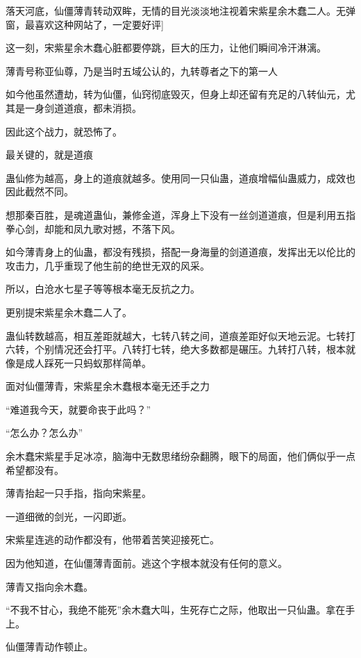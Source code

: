 
\begin{this_body}



落天河底，仙僵薄青转动双眸，无情的目光淡淡地注视着宋紫星余木蠢二人。无弹窗，最喜欢这种网站了，一定要好评]

这一刻，宋紫星余木蠢心脏都要停跳，巨大的压力，让他们瞬间冷汗淋漓。

薄青号称亚仙尊，乃是当时五域公认的，九转尊者之下的第一人

如今他虽然遭劫，转为仙僵，仙窍彻底毁灭，但身上却还留有充足的八转仙元，尤其是一身剑道道痕，都未消损。

因此这个战力，就恐怖了。

最关键的，就是道痕

蛊仙修为越高，身上的道痕就越多。使用同一只仙蛊，道痕增幅仙蛊威力，成效也因此截然不同。

想那秦百胜，是魂道蛊仙，兼修金道，浑身上下没有一丝剑道道痕，但是利用五指拳心剑，却能和凤九歌对撼，不落下风。

如今薄青身上的仙蛊，都没有残损，搭配一身海量的剑道道痕，发挥出无以伦比的攻击力，几乎重现了他生前的绝世无双的风采。

所以，白沧水七星子等等根本毫无反抗之力。

更别提宋紫星余木蠢二人了。

蛊仙转数越高，相互差距就越大，七转八转之间，道痕差距好似天地云泥。七转打六转，个别情况还会打平。八转打七转，绝大多数都是碾压。九转打八转，根本就像是成人踩死一只蚂蚁那样简单。

面对仙僵薄青，宋紫星余木蠢根本毫无还手之力

“难道我今天，就要命丧于此吗？”

“怎么办？怎么办”

余木蠢宋紫星手足冰凉，脑海中无数思绪纷杂翻腾，眼下的局面，他们俩似乎一点希望都没有。

薄青抬起一只手指，指向宋紫星。

一道细微的剑光，一闪即逝。

宋紫星连逃的动作都没有，他带着苦笑迎接死亡。

因为他知道，在仙僵薄青面前。逃这个字根本就没有任何的意义。

薄青又指向余木蠢。

“不我不甘心，我绝不能死”余木蠢大叫，生死存亡之际，他取出一只仙蛊。拿在手上。

仙僵薄青动作顿止。


\end{this_body}
